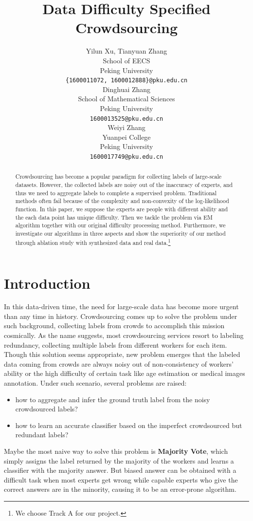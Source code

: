\documentclass{article}
\title{Data Difficulty Specified Crowdsourcing}
\author{
  Yilun Xu, Tianyuan Zhang \\%
  School of EECS\\
  Peking University\\
  \texttt{\{1600011072, 1600012888\}@pku.edu.cn} \\
  \And
  Dinghuai Zhang\\
  School of Mathematical Sciences\\
  Peking University\\
  \texttt{1600013525@pku.edu.cn}\\
  \And
  Weiyi Zhang\\
  Yuanpei College\\
  Peking University\\
  \texttt{1600017749@pku.edu.cn}
  }
\begin{document}

\maketitle

\begin{abstract}
  Crowdsourcing has become a popular paradigm for collecting labels of large-scale datasets. However, the collected labels are noisy out of the inaccuracy of experts, and thus we need to aggregate labels to complete a supervised problem. Traditional methods often fail because of the complexity and non-convexity of the log-likelihood function. In this paper, we suppose the experts are people with different ability and the each data point has unique difficulty. Then we tackle the problem via EM algorithm together with our original difficulty processing method. Furthermore, we investigate our algorithms in three aspects and show the superiority of our method through ablation study with synthesized data and real data.\footnote{We choose Track A for our project.}
\end{abstract}

\section{Introduction}
In this data-driven time, the need for large-scale data has become more urgent than any time in history. Crowdsourcing comes up to solve the problem under such background, collecting labels from crowds to accomplish this mission cosmically. As the name suggests, most crowdsourcing services resort to labeling redundancy, collecting multiple labels from different workers for each item.  Though this solution seems appropriate, new problem emerges that the labeled data coming from crowds are always noisy out of non-consistency of workers' ability or the high difficulty of certain task like age estimation or medical images annotation. Under such scenario, several problems are raised:
\begin{itemize}
\item how to aggregate and infer the ground truth label from the noisy crowdsourced labels?
\item how to learn an accurate classifier based on the imperfect crowdsourced but redundant labels?
\end{itemize}
Maybe the most naive way to solve this problem is \textbf{Majority Vote}, which simply assigns the label returned by the majority of the workers and learns a classifier with the majority answer. But biased answer can be obtained with a difficult task when most experts get wrong while capable experts who give the correct answers are in the minority, causing it to be an error-prone algorithm.
\end{document}
